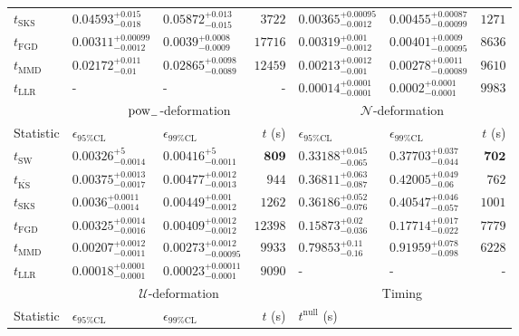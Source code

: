 \begin{tabular}{l|llr|llr}
	$t_{\mathrm{SKS}}$ & $0.04593_{-0.018}^{+0.015}$ & $0.05872_{-0.015}^{+0.013}$ & $3722$ & $0.00365_{-0.0012}^{+0.00095}$ & $0.00455_{-0.00099}^{+0.00087}$ & $1271$ \\
	$t_{\mathrm{FGD}}$ & ${\mathbf{0.00311_{-0.0012}^{+0.00099}}}$ & ${\mathbf{0.0039_{-0.0009}^{+0.0008}}}$ & $17716$ & $0.00319_{-0.0012}^{+0.001}$ & $0.00401_{-0.00095}^{+0.0009}$ & $8636$ \\
	$t_{\mathrm{MMD}}$ & $0.02172_{-0.01}^{+0.011}$ & $0.02865_{-0.0089}^{+0.0098}$ & $12459$ & ${\mathbf{0.00213_{-0.001}^{+0.0012}}}$ & ${\mathbf{0.00278_{-0.00089}^{+0.0011}}}$ & $9610$ \\
	$t_{\mathrm{LLR}}$ & - & - & - & $0.00014_{-0.0001}^{+0.0001}$ & $0.0002_{-0.0001}^{+0.0001}$ & $9983$ \\
	\toprule
	\multicolumn{1}{c}{} & \multicolumn{3}{c}{$\rm{pow}_{-}$-deformation} & \multicolumn{3}{c}{$\mathcal{N}$-deformation} \\
	Statistic & $\epsilon_{95\%\mathrm{CL}}$ & $\epsilon_{99\%\mathrm{CL}}$ & $t$ (s) & $\epsilon_{95\%\mathrm{CL}}$ & $\epsilon_{99\%\mathrm{CL}}$ & $t$ (s) \\
	\midrule
	$t_{\mathrm{SW}}$ & $0.00326_{-0.0014}^{+5}$ & $0.00416_{-0.0011}^{+5}$ & ${\mathbf{809}}$ & $0.33188_{-0.065}^{+0.045}$ & $0.37703_{-0.044}^{+0.037}$ & ${\mathbf{702}}$ \\
	$t_{\overline{\mathrm{KS}}}$ & $0.00375_{-0.0017}^{+0.0013}$ & $0.00477_{-0.0013}^{+0.0012}$ & $944$ & $0.36811_{-0.087}^{+0.063}$ & $0.42005_{-0.06}^{+0.049}$ & $762$ \\
	$t_{\mathrm{SKS}}$ & $0.0036_{-0.0014}^{+0.0011}$ & $0.00449_{-0.0012}^{+0.001}$ & $1262$ & $0.36186_{-0.076}^{+0.052}$ & $0.40547_{-0.057}^{+0.046}$ & $1001$ \\
	$t_{\mathrm{FGD}}$ & $0.00325_{-0.0016}^{+0.0014}$ & $0.00409_{-0.0012}^{+0.0012}$ & $12398$ & ${\mathbf{0.15873_{-0.036}^{+0.02}}}$ & ${\mathbf{0.17714_{-0.022}^{+0.017}}}$ & $7779$ \\
	$t_{\mathrm{MMD}}$ & ${\mathbf{0.00207_{-0.0011}^{+0.0012}}}$ & ${\mathbf{0.00273_{-0.00095}^{+0.0012}}}$ & $9933$ & $0.79853_{-0.16}^{+0.11}$ & $0.91959_{-0.098}^{+0.078}$ & $6228$ \\
	$t_{\mathrm{LLR}}$ & $0.00018_{-0.0001}^{+0.0001}$ & $0.00023_{-0.0001}^{+0.00011}$ & $9090$ & - & - & - \\
	\toprule
	\multicolumn{1}{c}{} & \multicolumn{3}{c}{$\mathcal{U}$-deformation} & \multicolumn{3}{c}{Timing} \\
	Statistic & $\epsilon_{95\%\mathrm{CL}}$ & $\epsilon_{99\%\mathrm{CL}}$ & $t$ (s) & $t^{\mathrm{null}}$ (s) \\

\end{tabular}

